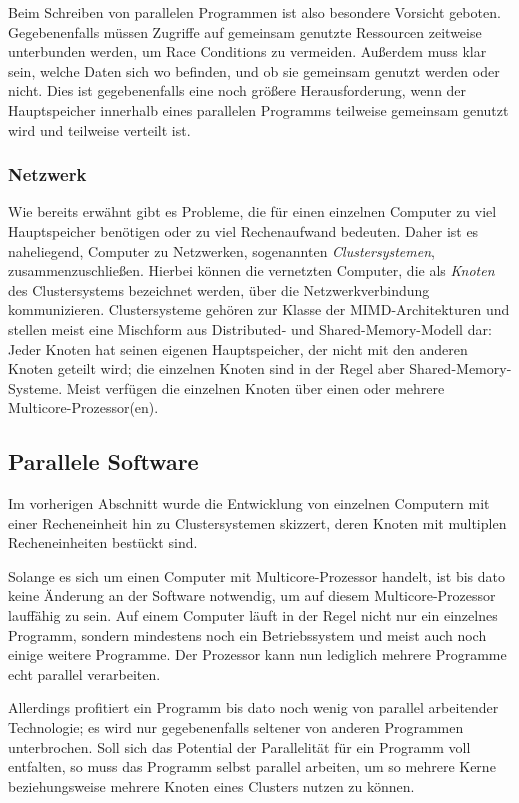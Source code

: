 	Beim Schreiben von parallelen Programmen ist also besondere Vorsicht geboten. Gegebenenfalls müssen Zugriffe auf gemeinsam genutzte Ressourcen zeitweise unterbunden werden, um Race Conditions
	zu vermeiden. Außerdem muss klar sein, welche Daten sich wo befinden, und ob sie gemeinsam genutzt werden oder nicht. Dies ist gegebenenfalls eine noch größere Herausforderung, wenn der Hauptspeicher 
	innerhalb eines parallelen Programms teilweise gemeinsam genutzt wird und teilweise verteilt ist.
	
      \subsubsection{Netzwerk}
      \label{sec:netzwerk}
		
	Wie bereits erwähnt gibt es Probleme, die für einen einzelnen Computer zu viel Hauptspeicher benötigen oder zu viel Rechenaufwand bedeuten. Daher ist es naheliegend, Computer zu Netzwerken,
	sogenannten \textit{Clustersystemen}, zusammenzuschließen. Hierbei können die vernetzten Computer, die als \textit{Knoten} des Clustersystems bezeichnet werden, über die 
	Netzwerkverbindung kommunizieren. Clustersysteme gehören zur Klasse der MIMD-Architekturen und stellen meist eine Mischform aus Distributed- und Shared-Memory-Modell dar: Jeder Knoten hat 
	seinen eigenen Hauptspeicher, der nicht mit den anderen Knoten geteilt wird; die einzelnen Knoten sind in der Regel aber Shared-Memory-Systeme. Meist verfügen die einzelnen Knoten über
	einen oder mehrere Multicore-Prozessor(en). \citep{cluster}
	
    \subsection{Parallele Software}
      Im vorherigen Abschnitt wurde die Entwicklung von einzelnen Computern mit einer Recheneinheit hin zu Clustersystemen skizzert, deren Knoten mit multiplen Recheneinheiten bestückt sind.
      
      Solange es sich um einen Computer mit Multicore-Prozessor handelt, ist bis dato keine Änderung an der Software notwendig, um auf diesem Multicore-Prozessor lauffähig zu sein. 
      Auf einem Computer läuft in der Regel nicht nur ein einzelnes Programm, sondern mindestens noch ein Betriebssystem und meist auch noch einige weitere Programme.
      Der Prozessor kann nun lediglich mehrere Programme echt parallel verarbeiten.
      
      Allerdings profitiert ein Programm bis dato noch wenig von parallel arbeitender Technologie; es wird nur gegebenenfalls seltener von anderen Programmen unterbrochen.
      Soll sich das Potential der Parallelität für ein Programm voll entfalten, so muss das Programm selbst parallel arbeiten, um so mehrere Kerne beziehungsweise mehrere Knoten eines 
      Clusters nutzen zu können. 
      
